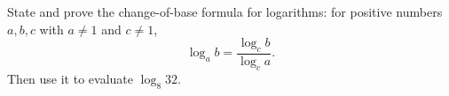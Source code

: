 State and prove the change-of-base formula for logarithms: for positive numbers $a,b,c$ with $a\ne1$ and $c\ne1$,
\[\log_ab=\dfrac{\log_cb}{\log_ca}.\]
Then use it to evaluate $\log_8 32$.
